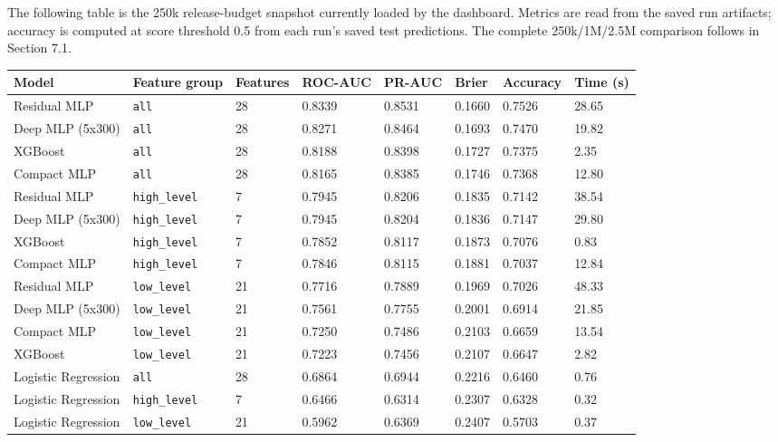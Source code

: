 \documentclass[11pt,a4paper,oneside]{report}
\begin{document}
The following table is the 250k release-budget snapshot currently loaded by the dashboard. Metrics are read from the saved run artifacts; accuracy is computed at score threshold 0.5 from each run's saved test predictions. The complete 250k/1M/2.5M comparison follows in Section 7.1.

\begin{landscape}

\small\setlength{\tabcolsep}{3pt}\renewcommand{\arraystretch}{1.15}
\begin{longtable}{p{2.2cm} p{1.35cm} p{1.35cm} p{1.35cm} p{1.35cm} p{1.35cm} p{1.35cm} p{1.35cm}}
\toprule
Model & Feature group & Features & ROC-AUC & PR-AUC & Brier & Accuracy & Time (s) \\ \midrule
Residual MLP & \texttt{all} & 28 & 0.8339 & 0.8531 & 0.1660 & 0.7526 & 28.65 \\ 
Deep MLP (5x300) & \texttt{all} & 28 & 0.8271 & 0.8464 & 0.1693 & 0.7470 & 19.82 \\ 
XGBoost & \texttt{all} & 28 & 0.8188 & 0.8398 & 0.1727 & 0.7375 & 2.35 \\ 
Compact MLP & \texttt{all} & 28 & 0.8165 & 0.8385 & 0.1746 & 0.7368 & 12.80 \\ 
Residual MLP & \texttt{high\_level} & 7 & 0.7945 & 0.8206 & 0.1835 & 0.7142 & 38.54 \\ 
Deep MLP (5x300) & \texttt{high\_level} & 7 & 0.7945 & 0.8204 & 0.1836 & 0.7147 & 29.80 \\ 
XGBoost & \texttt{high\_level} & 7 & 0.7852 & 0.8117 & 0.1873 & 0.7076 & 0.83 \\ 
Compact MLP & \texttt{high\_level} & 7 & 0.7846 & 0.8115 & 0.1881 & 0.7037 & 12.84 \\ 
Residual MLP & \texttt{low\_level} & 21 & 0.7716 & 0.7889 & 0.1969 & 0.7026 & 48.33 \\ 
Deep MLP (5x300) & \texttt{low\_level} & 21 & 0.7561 & 0.7755 & 0.2001 & 0.6914 & 21.85 \\ 
Compact MLP & \texttt{low\_level} & 21 & 0.7250 & 0.7486 & 0.2103 & 0.6659 & 13.54 \\ 
XGBoost & \texttt{low\_level} & 21 & 0.7223 & 0.7456 & 0.2107 & 0.6647 & 2.82 \\ 
Logistic Regression & \texttt{all} & 28 & 0.6864 & 0.6944 & 0.2216 & 0.6460 & 0.76 \\ 
Logistic Regression & \texttt{high\_level} & 7 & 0.6466 & 0.6314 & 0.2307 & 0.6328 & 0.32 \\ 
Logistic Regression & \texttt{low\_level} & 21 & 0.5962 & 0.6369 & 0.2407 & 0.5703 & 0.37 \\ 
\bottomrule
\end{longtable}

\end{landscape}
\end{document}
